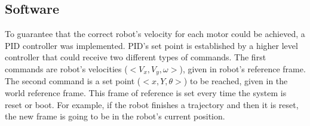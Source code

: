 \subsection{Software}
To guarantee that the correct robot's velocity for each motor could be achieved, a PID controller was implemented. PID's set point is established by a higher level controller that could receive two different types of commands. The first commands are robot's velocities ($<V_x,V_y,\omega>$), given in robot's reference frame. The second command is a set point ($<x, Y, \theta>$) to be reached, given in the world reference frame. This frame of reference is set every time the system is reset or boot. For example, if the robot finishes a trajectory and then it is reset, the new frame is going to be in the robot's current position.  %


